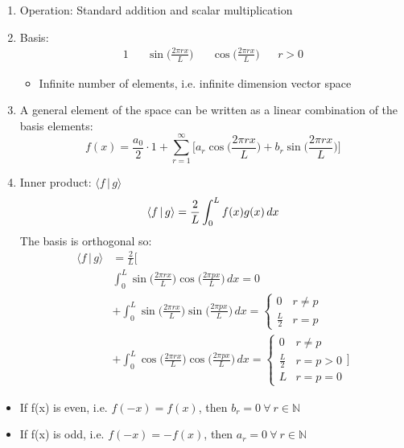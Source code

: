 \documentclass[a4paper, 11pt, normalem]{report}
\begin{document}
\begin{enumerate}
    \item Operation: Standard addition and scalar multiplication
    \item Basis:
            \begin{align*}
                1 && \sin\Big(\frac{2\pi rx}{L}\Big) && \cos\Big(\frac{2\pi rx}{L}\Big) && r > 0
            \end{align*}
        \begin{itemize}
            \item Infinite number of elements, i.e. infinite dimension vector space
        \end{itemize}
    \item A general element of the space can be written as a linear combination of the basis elements:
            \begin{equation*}
                f(x) = \frac{a_0}{2} \cdot 1 + \sum_{r = 1}^{\infty} \Bigg[a_r \cos\Big(\frac{2\pi rx}{L}\Big) + b_r \sin\Big(\frac{2\pi rx}{L}\Big)\Bigg]
            \end{equation*}
    \item Inner product: $\langle f \,|\, g \rangle$
            \begin{equation*}
                \langle f \,|\, g \rangle = \frac{2}{L} \int_{0}^{L} f(x)g(x)\,dx \\
            \end{equation*}
            The basis is orthogonal so:
            \begin{align*}
                \langle f \,|\, g \rangle &= \frac{2}{L} \Bigg[ \\
                & \int_{0}^{L} \sin\Big(\frac{2\pi rx}{L}\Big)\cos\Big(\frac{2\pi px}{L}\Big) \, dx = 0 \\
                &+ \int_{0}^{L} \sin\Big(\frac{2\pi rx}{L}\Big)\sin\Big(\frac{2\pi px}{L}\Big) \, dx =
                \begin{cases}
                    0 & r \neq p \\
                    \frac{L}{2} & r = p
                \end{cases} \\
                &+ \int_{0}^{L} \cos\Big(\frac{2\pi rx}{L}\Big)\cos\Big(\frac{2\pi px}{L}\Big) \, dx =
                \begin{cases}
                    0 & r \neq p \\
                    \frac{L}{2} & r = p > 0 \\
                    L & r = p = 0
                \end{cases} \Bigg]
            \end{align*}
\end{enumerate}
\begin{itemize}
    \item  If f(x) is even, i.e. $f(-x) = f(x)$, then $b_r = 0 ~\forall~ r \in \mathbb{N}$
    \item If f(x) is odd, i.e. $f(-x) = -f(x)$, then $a_r = 0 ~\forall~ r \in \mathbb{N}$
\end{itemize}
\end{document}
